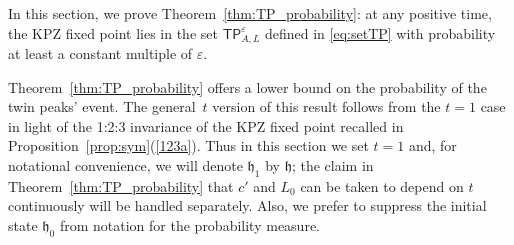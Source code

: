 \documentclass[oneside,final,11pt]{amsart}
\newtheorem{thm}{Theorem}[section]
\theoremstyle{definition}
\newcounter{assum}
\newcommand{\fh}{\mathfrak{h}}
\newcommand{\TP}[1]{\mathsf{TP}_{\!\!#1}}
\newcommand{\R}{\mathbb{R}}
\newcommand{\CS}{\mathcal{S}}
\renewcommand{\S}{\CS}
\newcommand{\1}[1]{\mathbf{1}_{#1}}
\newcommand{\eps}{\varepsilon}
\newcommand{\hlim}{\mathfrak{h}}
\newcommand{\mh}[1]{\marginnote{\tiny{\color{blue}[MH: #1]}}}
\newcommand{\smallconst}{c'}
\renewcommand{\P}{\mathbb P}
\numberwithin{equation}{section}
\begin{document}


In this section, we prove Theorem~\ref{thm:TP_probability}: at any positive time, the KPZ fixed point lies in the set $\TP{A,L}^{\eps}$ defined in \eqref{eq:setTP} with probability at least a constant multiple of $\varepsilon$.


Theorem~\ref{thm:TP_probability} offers a lower bound on the probability of the twin peaks' event. The general~$t$ version of this result follows from the $t=1$ case in light of the 1:2:3 invariance of the KPZ fixed point recalled in Proposition~\ref{prop:sym}(\ref{123a}). Thus in this section we set $t=1$ and, for notational convenience, we will denote $\hlim_1$ by $\hlim$; the claim in Theorem~\ref{thm:TP_probability} that $\smallconst$ and $L_0$ can be taken to depend on $t$ continuously will be handled separately. Also, we prefer to suppress the initial state $\fh_0$ from notation for the probability measure.
\end{document}

